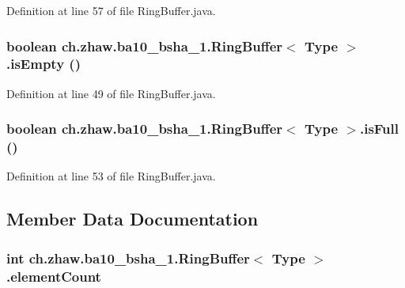 Definition at line 57 of file RingBuffer.java.\hypertarget{classch_1_1zhaw_1_1ba10__bsha__1_1_1RingBuffer_3_01Type_01_4_aecfc46c5e25cecd04fdabd85d773a5d8}{
\subsubsection[{isEmpty}]{\setlength{\rightskip}{0pt plus 5cm}boolean ch.zhaw.ba10\_\-bsha\_\-1.RingBuffer$<$ Type $>$.isEmpty ()}}
\label{classch_1_1zhaw_1_1ba10__bsha__1_1_1RingBuffer_3_01Type_01_4_aecfc46c5e25cecd04fdabd85d773a5d8}


Definition at line 49 of file RingBuffer.java.\hypertarget{classch_1_1zhaw_1_1ba10__bsha__1_1_1RingBuffer_3_01Type_01_4_a15be0d2b15a323b9d3fab9bcf7ebe9a8}{
\subsubsection[{isFull}]{\setlength{\rightskip}{0pt plus 5cm}boolean ch.zhaw.ba10\_\-bsha\_\-1.RingBuffer$<$ Type $>$.isFull ()}}
\label{classch_1_1zhaw_1_1ba10__bsha__1_1_1RingBuffer_3_01Type_01_4_a15be0d2b15a323b9d3fab9bcf7ebe9a8}


Definition at line 53 of file RingBuffer.java.

\subsection{Member Data Documentation}
\hypertarget{classch_1_1zhaw_1_1ba10__bsha__1_1_1RingBuffer_3_01Type_01_4_a83cb75811921f53d1ea9cd289d6132a6}{
\subsubsection[{elementCount}]{\setlength{\rightskip}{0pt plus 5cm}int ch.zhaw.ba10\_\-bsha\_\-1.RingBuffer$<$ Type $>$.{\bf elementCount}}}
\label{classch_1_1zhaw_1_1ba10__bsha__1_1_1RingBuffer_3_01Type_01_4_a83cb75811921f53d1ea9cd289d6132a6}


